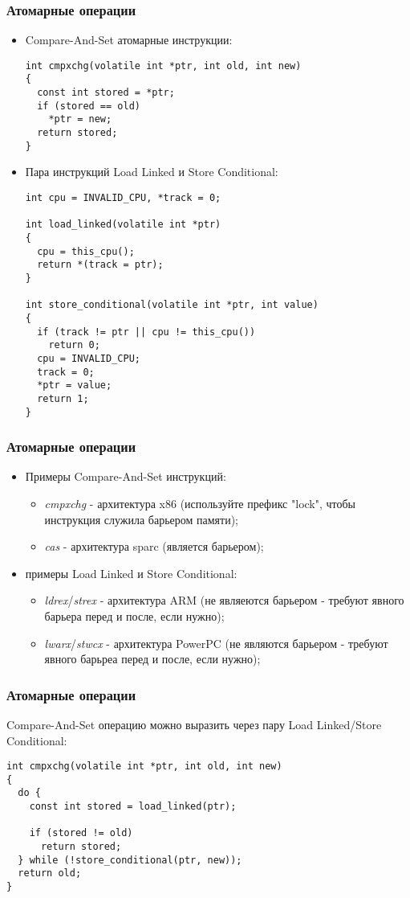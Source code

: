 \begin{frame}[fragile]
\frametitle{Атомарные операции}

\begin{itemize}
  \item Compare-And-Set атомарные инструкции:
    \begin{lstlisting}
int cmpxchg(volatile int *ptr, int old, int new)
{
  const int stored = *ptr;
  if (stored == old)
    *ptr = new;
  return stored;
}
    \end{lstlisting}
  \item Пара инструкций Load Linked и Store Conditional:
    \begin{lstlisting}
int cpu = INVALID_CPU, *track = 0;

int load_linked(volatile int *ptr)
{
  cpu = this_cpu();
  return *(track = ptr);
}

int store_conditional(volatile int *ptr, int value)
{
  if (track != ptr || cpu != this_cpu())
    return 0;
  cpu = INVALID_CPU;
  track = 0;
  *ptr = value;
  return 1;
}
    \end{lstlisting}
\end{itemize}
\end{frame}

\begin{frame}
\frametitle{Атомарные операции}

\begin{itemize}
  \item Примеры Compare-And-Set инструкций:
        \begin{itemize}
          \item \emph{cmpxchg} - архитектура x86 (используйте префикс "lock",
                чтобы инструкция служила барьером памяти);
          \item \emph{cas} - архитектура sparc (является барьером);
        \end{itemize}
  \item примеры Load Linked и Store Conditional:
        \begin{itemize}
          \item \emph{ldrex}/\emph{strex} - архитектура ARM (не являеются
                барьером - требуют явного барьера перед и после, если нужно);
          \item \emph{lwarx}/\emph{stwcx} - архитектура PowerPC (не являются
                барьером - требуют явного барьреа перед и после, если нужно);
        \end{itemize}
\end{itemize}
\end{frame}

\begin{frame}[fragile]
\frametitle{Атомарные операции}

Compare-And-Set операцию можно выразить через пару Load Linked/Store
Conditional:
\begin{lstlisting}
int cmpxchg(volatile int *ptr, int old, int new)
{
  do {
    const int stored = load_linked(ptr);

    if (stored != old)
      return stored;
  } while (!store_conditional(ptr, new));
  return old;
}
\end{lstlisting}
\end{frame}
